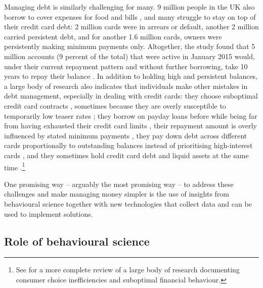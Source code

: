 Managing debt is similarly challenging for many. 9 million people in the UK
also borrow to cover expenses for food and bills \citep{mps2018building}, and
many struggle to stay on top of their credit card debt: 2 million cards were in
arrears or default, another 2 million carried persistent debt, and for another
1.6 million cards, owners were persistently making minimum payments only.
Altogether, the study found that 5 million accounts (9 percent of the total)
that were active in January 2015 would, under their current repayment pattern
and without further borrowing, take 10 years to repay their balance
\citep{fca2016credit}. In addition to holding high and persistent balances, a
large body of research also indicates that individuals make other mistakes in
debt management, especially in dealing with credit cards: they choose
suboptimal credit card contracts \citep{agarwal2015consumers}, sometimes
because they are overly susceptible to temporarily low teaser rates
\citep{shui2004time, ausubel1991failure}; they borrow on payday loans before
while being far from having exhausted their credit card limits
\citep{agarwal2009payday}, their repayment amount is overly influenced by
stated minimum payments \citep{sakaguchi2022default}, they pay down debt across
different cards proportionally to outstanding balances instead of prioritising
high-interest cards \citep{gathergood2019individuals}, and they sometimes hold
credit card debt and liquid assets at the same time \citep{gross2002liquidity,
    gathergood2020co}.\footnote{See \citet{agarwal2017shapes} for a more
    complete review of a large body of research documenting consumer choice
inefficiencies and suboptimal financial behaviour.} 

One promising way -- arguably the most promising way -- to address these
challenges and make managing money simpler is the use of insights from
behavioural science together with new technologies that collect data and can be
used to implement solutions.


\subsection{Role of behavioural science}%
\label{sub:role_of_behavioural_science}

